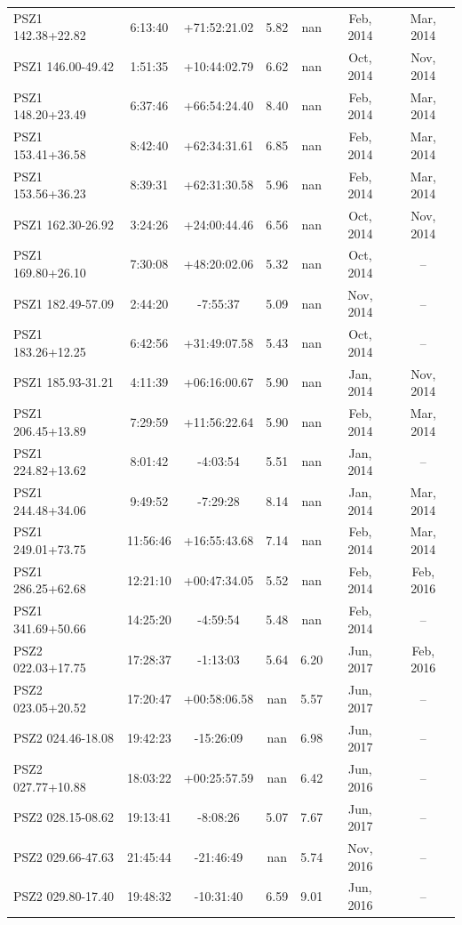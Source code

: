 \documentclass[apj, revtex4]{emulateapj}
\begin{document}
\begin{longtable*}{lcccccc}
PSZ1 142.38+22.82 & 6:13:40 & +71:52:21.02 & 5.82 & nan & Feb, 2014 & Mar, 2014\\
PSZ1 146.00-49.42 & 1:51:35 & +10:44:02.79 & 6.62 & nan & Oct, 2014 & Nov, 2014\\
PSZ1 148.20+23.49 & 6:37:46 & +66:54:24.40 & 8.40 & nan & Feb, 2014 & Mar, 2014\\
PSZ1 153.41+36.58 & 8:42:40 & +62:34:31.61 & 6.85 & nan & Feb, 2014 & Mar, 2014\\
PSZ1 153.56+36.23 & 8:39:31 & +62:31:30.58 & 5.96 & nan & Feb, 2014 & Mar, 2014\\
PSZ1 162.30-26.92 & 3:24:26 & +24:00:44.46 & 6.56 & nan & Oct, 2014 & Nov, 2014\\
PSZ1 169.80+26.10 & 7:30:08 & +48:20:02.06 & 5.32 & nan & Oct, 2014 & --\\
PSZ1 182.49-57.09 & 2:44:20 & -7:55:37 & 5.09 & nan & Nov, 2014 & --\\
PSZ1 183.26+12.25 & 6:42:56 & +31:49:07.58 & 5.43 & nan & Oct, 2014 & --\\
PSZ1 185.93-31.21 & 4:11:39 & +06:16:00.67 & 5.90 & nan & Jan, 2014 & Nov, 2014\\
PSZ1 206.45+13.89 & 7:29:59 & +11:56:22.64 & 5.90 & nan & Feb, 2014 & Mar, 2014\\
PSZ1 224.82+13.62 & 8:01:42 & -4:03:54 & 5.51 & nan & Jan, 2014 & --\\
PSZ1 244.48+34.06 & 9:49:52 & -7:29:28 & 8.14 & nan & Jan, 2014 & Mar, 2014\\
PSZ1 249.01+73.75 & 11:56:46 & +16:55:43.68 & 7.14 & nan & Feb, 2014 & Mar, 2014\\
PSZ1 286.25+62.68 & 12:21:10 & +00:47:34.05 & 5.52 & nan & Feb, 2014 & Feb, 2016\\
PSZ1 341.69+50.66 & 14:25:20 & -4:59:54 & 5.48 & nan & Feb, 2014 & --\\
PSZ2 022.03+17.75 & 17:28:37 & -1:13:03 & 5.64 & 6.20 & Jun, 2017 & Feb, 2016\\
PSZ2 023.05+20.52 & 17:20:47 & +00:58:06.58 & nan & 5.57 & Jun, 2017 & --\\
PSZ2 024.46-18.08 & 19:42:23 & -15:26:09 & nan & 6.98 & Jun, 2017 & --\\
PSZ2 027.77+10.88 & 18:03:22 & +00:25:57.59 & nan & 6.42 & Jun, 2016 & --\\
PSZ2 028.15-08.62 & 19:13:41 & -8:08:26 & 5.07 & 7.67 & Jun, 2017 & --\\
PSZ2 029.66-47.63 & 21:45:44 & -21:46:49 & nan & 5.74 & Nov, 2016 & --\\
PSZ2 029.80-17.40 & 19:48:32 & -10:31:40 & 6.59 & 9.01 & Jun, 2016 & --\\

\end{longtable*}
\end{document}
